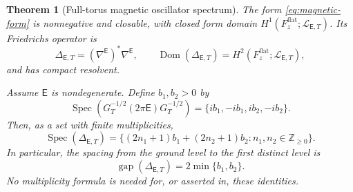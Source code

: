 \documentclass[11pt]{article}
\numberwithin{equation}{section}
\newtheorem{theorem}{Theorem}[section]
\theoremstyle{definition}
\theoremstyle{remark}
\newcommand{\Z}{\mathbb Z}
\newcommand{\Spec}{\operatorname{Spec}}
\begin{document}
\begin{theorem}[Full-torus magnetic oscillator spectrum]
\label{thm:full-torus-magnetic-spectrum}
The form \eqref{eq:magnetic-form} is nonnegative and closable, with closed
form domain $H^1(F_z^{\mathrm{flat}};\mathcal L_{\mathsf E,T})$.  Its
Friedrichs operator is
\[
 \Delta_{\mathsf E,T}=(\nabla^{\mathsf E})^*\nabla^{\mathsf E},
 \qquad
 \operatorname{Dom}(\Delta_{\mathsf E,T})
 =H^2(F_z^{\mathrm{flat}};\mathcal L_{\mathsf E,T}),
\]
and has compact resolvent.

Assume $\mathsf E$ is nondegenerate.  Define $b_1,b_2>0$ by
\begin{equation}\label{eq:magnetic-frequency-definition}
 \Spec\!\left(G_T^{-1/2}(2\pi\mathsf E)G_T^{-1/2}\right)
 =\{ib_1,-ib_1,ib_2,-ib_2\}.
\end{equation}
Then, as a set with finite multiplicities,
\begin{equation}\label{eq:magnetic-oscillator-spectrum}
 \Spec(\Delta_{\mathsf E,T})
 =\{(2n_1+1)b_1+(2n_2+1)b_2:
 n_1,n_2\in\Z_{\ge0}\}.
\end{equation}
In particular, the spacing from the ground level to the first distinct
level is
\begin{equation}\label{eq:magnetic-level-gap}
 \operatorname{gap}(\Delta_{\mathsf E,T})=2\min\{b_1,b_2\}.
\end{equation}
No multiplicity formula is needed for, or asserted in, these identities.
\end{theorem}
\end{document}
